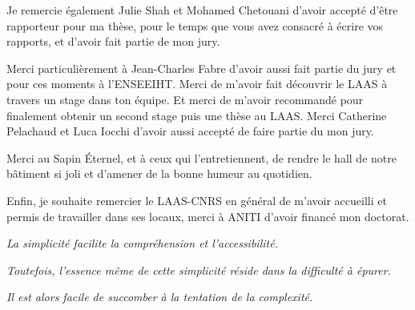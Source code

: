 
Je remercie également Julie Shah et Mohamed Chetouani d'avoir accepté d'être rapporteur pour ma thèse, pour le temps que vous avez consacré à écrire vos rapports, et d'avoir fait partie de mon jury. 

Merci particulièrement à Jean-Charles Fabre d'avoir aussi fait partie du jury et pour ces moments à l'ENSEEIHT. Merci de m'avoir fait découvrir le LAAS à travers un stage dans ton équipe. Et merci de m'avoir recommandé pour finalement obtenir un second stage puis une thèse au LAAS.
Merci Catherine Pelachaud et Luca Iocchi d'avoir aussi accepté de faire partie du mon jury. 



Merci au Sapin Éternel, et à ceux qui l'entretiennent, de rendre le hall de notre bâtiment si joli et d'amener de la bonne humeur au quotidien.



Enfin, je souhaite remercier le LAAS-CNRS en général de m'avoir accueilli et permis de travailler dans ses locaux, merci à ANITI d'avoir financé mon doctorat.


\vfill




    



\begin{center}
    
    \textit{La simplicité facilite la compréhension et l'accessibilité.}
    
    \textit{Toutefois, l'essence même de cette simplicité réside dans la difficulté à épurer.}
    
    \textit{Il est alors facile de succomber à la tentation de la complexité.}
    
\end{center}

\vfill 